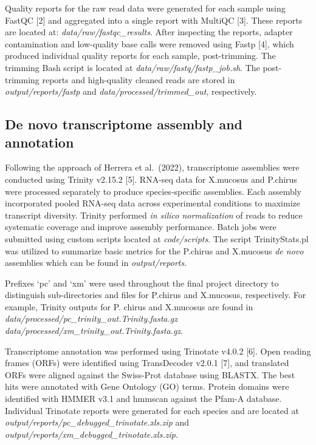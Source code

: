 \documentclass[12pt,]{article}
\begin{document}
Quality reports for the raw read data were generated for each sample
using FastQC {[}2{]} and aggregated into a single report with MultiQC
{[}3{]}. These reports are located at: \emph{data/raw/fastqc\_results}.
After inspecting the reports, adapter contamination and low-quality base
calls were removed using Fastp {[}4{]}, which produced individual
quality reports for each sample, post-trimming. The trimming Bash script
is located at \emph{data/raw/fastq/fastp\_job.sh}. The post-trimming
reports and high-quality cleaned reads are stored in
\emph{output/reports/fastp} and \emph{data/processed/trimmed\_out},
respectively.

\subsection{De novo transcriptome assembly and
annotation}\label{de-novo-transcriptome-assembly-and-annotation}

Following the approach of Herrera et al.~(2022), transcriptome
assemblies were conducted using Trinity v2.15.2 {[}5{]}. RNA-seq data
for X.mucosus and P.chirus were processed separately to produce
species-specific assemblies. Each assembly incorporated pooled RNA-seq
data across experimental conditions to maximize transcript diversity.
Trinity performed \emph{in silico normalization} of reads to reduce
systematic coverage and improve assembly performance. Batch jobs were
submitted using custom scripts located at \emph{code/scripts}. The
script TrinityStats.pl was utilized to summarize basic metrics for the
P.chirus and X.mucosus \emph{de novo} assemblies which can be found in
\emph{output/reports}.

Prefixes `pc' and `xm' were used throughout the final project directory
to distinguish sub-directories and files for P.chirus and X.mucosus,
respectively. For example, Trinity outputs for P. chirus and X.mucosus
are found in \emph{data/processed/pc\_trinity\_out.Trinity.fasta.gz}
\emph{data/processed/xm\_trinity\_out.Trinity.fasta.gz}.

Transcriptome annotation was performed using Trinotate v4.0.2 {[}6{]}.
Open reading frames (ORFs) were identified using TransDecoder v2.0.1
{[}7{]}, and translated ORFs were aligned against the Swiss-Prot
database using BLASTX. The best hits were annotated with Gene Ontology
(GO) terms. Protein domains were identified with HMMER v3.1 and hmmscan
against the Pfam-A database. Individual Trinotate reports were generated
for each species and are located at
\emph{output/reports/pc\_debugged\_trinotate.xls.zip} and
\emph{output/reports/xm\_debugged\_trinotate.xls.zip}.
\end{document}

